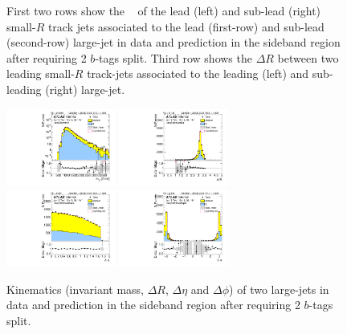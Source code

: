 \begin{figure}[htbp!]
\begin{center}
  \caption{First two rows show the \pt~ of the lead (left) and sub-lead (right) small-$R$ track jets associated to the lead (first-row) and sub-lead (second-row) large-\R jet in data and prediction in the sideband region after requiring 2 $b$-tags split. Third row shows the $\Delta R$ between two leading small-$R$ track-jets associated to the leading (left) and sub-leading (right) large-\R jet. }
  \label{fig:boosted-2bs-sideband-ak2}
\end{center}
\end{figure}


\begin{figure}[htbp!]
\begin{center}
\includegraphics[width=0.32\textwidth,angle=-90]{figures/boosted/Sideband/b77_TwoTag_split_Sideband_mHH_l_1.pdf}
\includegraphics[width=0.32\textwidth,angle=-90]{figures/boosted/Sideband/b77_TwoTag_split_Sideband_hCandDr.pdf}\\
\includegraphics[width=0.32\textwidth,angle=-90]{figures/boosted/Sideband/b77_TwoTag_split_Sideband_hCandDeta.pdf}
\includegraphics[width=0.32\textwidth,angle=-90]{figures/boosted/Sideband/b77_TwoTag_split_Sideband_hCandDphi.pdf}
  \caption{Kinematics (invariant mass, $\Delta R$, $\Delta \eta$ and $\Delta \phi$) of two large-\R jets in data and prediction in the sideband region after requiring 2 $b$-tags split. }
  \label{fig:boosted-2bs-sideband-ak10-system}
\end{center}
\end{figure}

\clearpage
